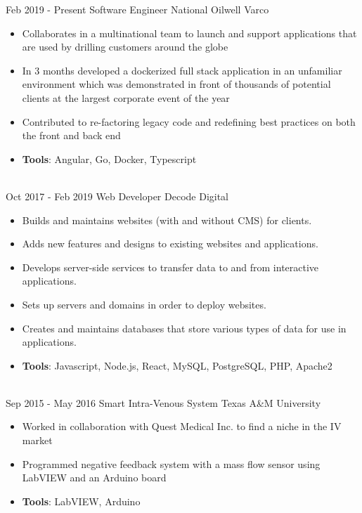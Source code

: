 \documentclass[letterpaper]{twentysecondcv} %
\begin{document}
\begin{twenty} %
\twentyitem
    	{Feb 2019 -}
		{Present}
        {Software Engineer}
        {National Oilwell Varco}
        {}
        {\begin{itemize}
        \item Collaborates in a multinational team to launch and support applications that are used by drilling customers around the globe
        \item In 3 months developed a dockerized full stack application in an unfamiliar environment which was demonstrated in front of thousands of potential clients at the largest corporate event of the year
        \item Contributed to re-factoring legacy code and redefining best practices on both the front and back end
        \item \textbf{Tools}: Angular, Go, Docker, Typescript
        \end{itemize}}
        \\
\twentyitem
    	{Oct 2017 -}
		{Feb 2019}
        {Web Developer}
        {Decode Digital}
        {}
        {\begin{itemize}
        \item Builds and maintains websites (with and without CMS) for clients.
        \item Adds new features and designs to existing websites and applications.
        \item Develops server-side services to transfer data to and from interactive applications.
        \item Sets up servers and domains in order to deploy websites.
        \item Creates and maintains databases that store various types of data for use in applications.
        \item \textbf{Tools}: Javascript, Node.js, React, MySQL, PostgreSQL, PHP, Apache2
        \end{itemize}}
        \\
\twentyitem
    	{Sep 2015 -}
		{May 2016}
        {Smart Intra-Venous System}
        {{Texas A\&M University}}
        {}
        {\begin{itemize}
        \item Worked in collaboration with Quest Medical Inc. to find a niche in the IV market
        \item Programmed negative feedback system with a mass flow sensor using LabVIEW and an Arduino board
        \item \textbf{Tools}: LabVIEW, Arduino
        \end{itemize}}
        \\
        
        
\end{twenty}
\end{document}
